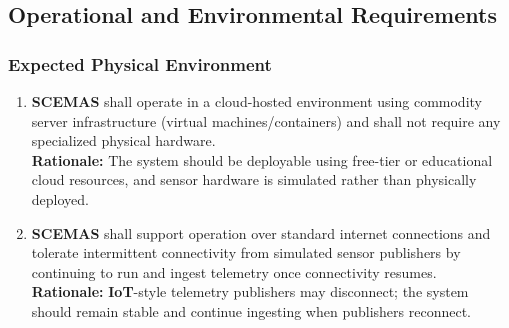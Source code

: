 \documentclass[]{article}
\begin{document}
\subsection{Operational and Environmental Requirements}
\label{sub:operational_and_environmental_requirements}

\subsubsection{Expected Physical Environment}
\label{ssub:expected_physical_environment}
\begin{enumerate}[{OE-EPE}1. ]
	\item \textbf{SCEMAS} shall operate in a cloud-hosted environment using commodity server infrastructure (virtual machines/containers) and shall not require any specialized physical hardware.\\
    \textbf{Rationale:} The system should be deployable using free-tier or educational cloud resources, and sensor hardware is simulated rather than physically deployed.
    
	\item \textbf{SCEMAS} shall support operation over standard internet connections and tolerate intermittent connectivity from simulated sensor publishers by continuing to run and ingest telemetry once connectivity resumes.\\
    \textbf{Rationale:} \textbf{IoT}-style telemetry publishers may disconnect; the system should remain stable and continue ingesting when publishers reconnect.
\end{enumerate}
\end{document}
